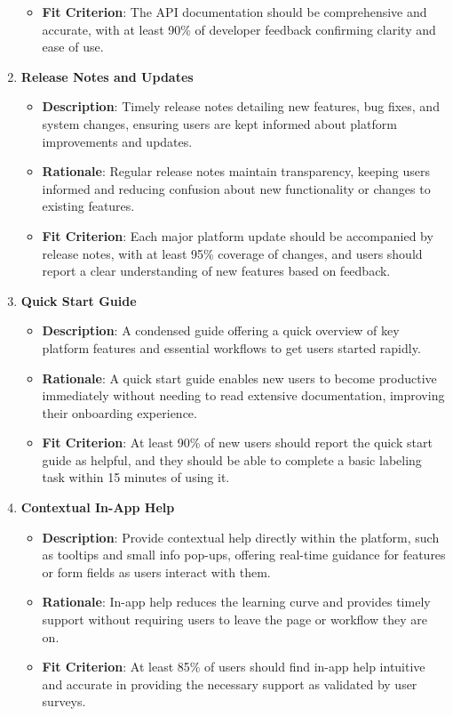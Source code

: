 \documentclass[12pt]{article}
\begin{document}
\begin{enumerate}
\begin{itemize}[leftmargin=2cm]
            \item \textbf{Fit Criterion}: The API documentation should be comprehensive and accurate, with at least 90\% of developer feedback confirming clarity and ease of use.
        \end{itemize}
    \item \textbf{Release Notes and Updates}  
        \begin{itemize}[leftmargin=2cm]
            \item \textbf{Description}: Timely release notes detailing new features, bug fixes, and system changes, ensuring users are kept informed about platform improvements and updates.  
            \item \textbf{Rationale}: Regular release notes maintain transparency, keeping users informed and reducing confusion about new functionality or changes to existing features.  
            \item \textbf{Fit Criterion}: Each major platform update should be accompanied by release notes, with at least 95\% coverage of changes, and users should report a clear understanding of new features based on feedback.
        \end{itemize}
    \item \textbf{Quick Start Guide}  
        \begin{itemize}[leftmargin=2cm]
            \item \textbf{Description}: A condensed guide offering a quick overview of key platform features and essential workflows to get users started rapidly.  
            \item \textbf{Rationale}: A quick start guide enables new users to become productive immediately without needing to read extensive documentation, improving their onboarding experience.  
            \item \textbf{Fit Criterion}: At least 90\% of new users should report the quick start guide as helpful, and they should be able to complete a basic labeling task within 15 minutes of using it.
        \end{itemize}
    \item \textbf{Contextual In-App Help}  
        \begin{itemize}[leftmargin=2cm]
            \item \textbf{Description}: Provide contextual help directly within the platform, such as tooltips and small info pop-ups, offering real-time guidance for features or form fields as users interact with them.  
            \item \textbf{Rationale}: In-app help reduces the learning curve and provides timely support without requiring users to leave the page or workflow they are on.  
            \item \textbf{Fit Criterion}: At least 85\% of users should find in-app help intuitive and accurate in providing the necessary support as validated by user surveys.
        \end{itemize}
\end{enumerate}
\end{document}
